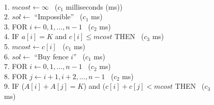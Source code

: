 \begin{figure}
\begin{algt}
\label{algo:analysis-cheapest-pair}
\\
1.\settowidth{\algbackindent}{1.}\hspace*{-\algbackindent}\hspace*{0.2in} $mcost\leftarrow\infty$ \hfill\ ($c_1$ milliseconds (ms))\\
2.\settowidth{\algbackindent}{2.}\hspace*{-\algbackindent}\hspace*{0.2in} $sol\leftarrow$ ``Impossible'' \hfill\ ($c_1$ ms)\\
3.\settowidth{\algbackindent}{3.}\hspace*{-\algbackindent}\hspace*{0.2in} FOR $i\leftarrow 0,1,\ldots,n-1$ \hfill\ ($c_2$ ms)\\
4.\settowidth{\algbackindent}{4.}\hspace*{-\algbackindent}\hspace*{0.2in}\hspace*{0.2in} IF $a[i]=K$ and $c[i]\leq mcost$ THEN \hfill\ ($c_3$ ms)\\
5.\settowidth{\algbackindent}{5.}\hspace*{-\algbackindent}\hspace*{0.2in}\hspace*{0.2in}\hspace*{0.2in} $mcost\leftarrow c[i]$ \hfill\ ($c_1$ ms)\\
6.\settowidth{\algbackindent}{6.}\hspace*{-\algbackindent}\hspace*{0.2in}\hspace*{0.2in}\hspace*{0.2in} $sol\leftarrow$ ``Buy fence $i$'' \hfill\ ($c_1$ ms)\\
7.\settowidth{\algbackindent}{7.}\hspace*{-\algbackindent}\hspace*{0.2in} FOR $i\leftarrow 0,1,\ldots,n-1$ \hfill\ ($c_2$ ms)\\
8.\settowidth{\algbackindent}{8.}\hspace*{-\algbackindent}\hspace*{0.2in}\hspace*{0.2in} FOR $j\leftarrow i+1,i+2,\ldots,n-1$ \hfill\ ($c_2$ ms)\\
9.\settowidth{\algbackindent}{9.}\hspace*{-\algbackindent}\hspace*{0.2in}\hspace*{0.2in}\hspace*{0.2in} IF ($A[i] + A[j] = K$) and ($c[i]+c[j]<mcost$ THEN \hfill\ ($c_3$ ms)\\

\end{algt}
\end{figure}
